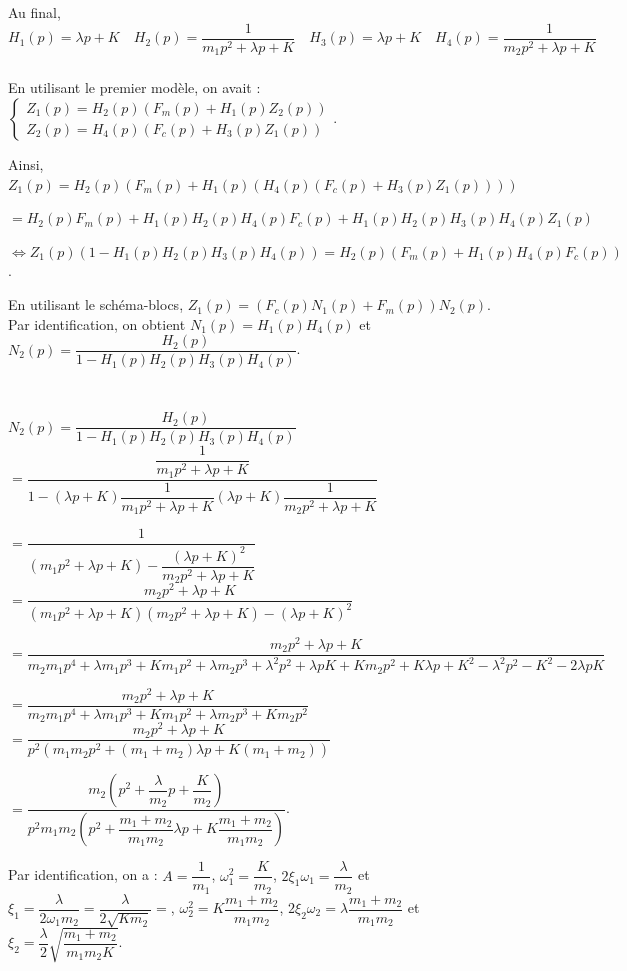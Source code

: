 \documentclass[10pt,fleqn]{article} %
\begin{document}
Au final, 
$$
H_1(p)=\lambda p+K \quad 
H_2(p)=\dfrac{1}{m_1p^2  + \lambda p+K} \quad 
H_3(p)=\lambda p+K  \quad 
H_4(p)=\dfrac{1}{m_2p^2  + \lambda p+K} 
$$

\subparagraph{}
En utilisant le premier modèle, on avait :
$
\left\{\begin{array}{l}
Z_1(p)=H_2(p)\left(F_m(p)+H_1(p)Z_2(p)\right) \\
Z_2(p)=H_4(p)\left(F_c(p)+H_3(p)Z_1(p)\right)
\end{array}
\right.
$. 

Ainsi, $Z_1(p)=H_2(p)\left(F_m(p)+H_1(p)\left( H_4(p)\left(F_c(p)+H_3(p)Z_1(p)\right)\right)\right) $

$=H_2(p)F_m(p)+H_1(p)H_2(p) H_4(p)F_c(p)+H_1(p)H_2(p) H_3(p)H_4(p)Z_1(p) $

$\Leftrightarrow Z_1(p)\left( 1-H_1(p)H_2(p) H_3(p)H_4(p)\right)=H_2(p)\left(F_m(p)+H_1(p)H_4(p)F_c(p)\right) $. 

En utilisant le schéma-blocs, $Z_1(p)=\left(F_c(p)N_1(p)+F_m(p)\right)N_2(p)$. 
Par identification, on obtient $N_1(p)=H_1(p)H_4(p)$ et $N_2(p)=\dfrac{H_2(p)}{1-H_1(p)H_2(p) H_3(p)H_4(p)}$.


\subparagraph{}
~\\

$N_2(p)=\dfrac{H_2(p)}{1-H_1(p)H_2(p) H_3(p)H_4(p)}$ 
$= \dfrac{\dfrac{1}{m_1p^2  + \lambda p+K}}{1-\left(\lambda p+K\right)\dfrac{1}{m_1p^2  + \lambda p+K} \left(\lambda p+K\right)\dfrac{1}{m_2p^2  + \lambda p+K}}$

$= \dfrac{1}{\left(m_1p^2  + \lambda p+K\right)- \dfrac{\left(\lambda p+K\right)^2}{m_2p^2  + \lambda p+K}}$
$= \dfrac{m_2p^2  + \lambda p+K}{\left(m_1p^2  + \lambda p+K\right)\left(m_2p^2  + \lambda p+K\right)- \left(\lambda p+K\right)^2}$

$= \dfrac{m_2p^2  + \lambda p+K}{
m_2m_1p^4  + \lambda m_1p^3+Km_1p^2+\lambda m_2p^3  + \lambda^2 p^2 +\lambda pK+Km_2p^2  + K\lambda p+K^2 - \lambda^2 p^2 -K^2 - 2\lambda p K}$

$= \dfrac{m_2p^2  + \lambda p+K}{
m_2m_1p^4  + \lambda m_1p^3+Km_1p^2+\lambda m_2p^3   +Km_2p^2 }$
$= \dfrac{m_2p^2  + \lambda p+K}{
p^2\left( m_1m_2p^2  + \left(m_1+ m_2\right) \lambda p  +K\left(m_1+m_2\right)\right) }$

$= \dfrac{m_2\left(p^2  + \dfrac{\lambda}{m_2}p+\dfrac{K}{m_2}\right)}{
p^2 m_1m_2 \left(p^2  + \dfrac{m_1+ m_2}{m_1m_2} \lambda p  +K\dfrac{m_1+m_2}{m_1m_2}\right) }$.

Par identification, on a : $A=\dfrac{1}{m_1}$, $\omega_1^2=\dfrac{K}{m_2}$, $2\xi_1\omega_1=\dfrac{\lambda}{m_2}$ et $\xi_1 = \dfrac{\lambda}{2 \omega_1 m_2}=\dfrac{\lambda}{2 \sqrt{Km_2}  } = $, $\omega_2^2=K\dfrac{m_1+m_2}{m_1m_2}$, $2\xi_2\omega_2=\lambda\dfrac{m_1+ m_2}{m_1m_2}$ et $\xi_2 = \dfrac{\lambda}{2}\sqrt{\dfrac{m_1+m_2}{m_1m_2 K}}$. 
\end{document}
